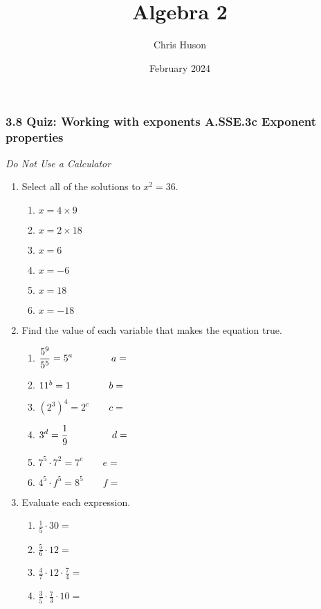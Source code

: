 \documentclass[12pt, twoside]{article}
\title{Algebra 2}
\author{Chris Huson}
\date{February 2024}
\begin{document}
\subsubsection*{3.8 Quiz: Working with exponents \hfill A.SSE.3c Exponent properties}
\emph{Do Not Use a Calculator}
\begin{enumerate}
\item Select all of the solutions to $x^2=36$.
    \begin{multicols}{2}
    \begin{enumerate}
        \item $x=4 \times 9$
        \item $x=2 \times 18$
        \item $x=6$
        \item $x=-6$
        \item $x=18$
        \item $x=-18$
    \end{enumerate}
    \end{multicols}

    \item Find the value of each variable that makes the equation true.
    \begin{multicols}{2}
    \begin{enumerate}[itemsep=0.5cm]
        \item $\displaystyle \frac{5^9}{5^5} = 5^a \hspace{1.4cm}  a=$
        \item $11^b=1 \hspace{1.4cm} b=$
        \item $(2^3)^4 = 2^c \qquad c=$
        \item $\displaystyle 3^d = \frac{1}{9} \hspace{1.6cm}  d=$
        \item $7^5 \cdot 7^2 = 7^e \qquad e=$
        \item $4^5 \cdot f^5 = 8^5 \qquad f=$
    \end{enumerate}
    \end{multicols} \vspace{0.5cm}

\item Evaluate each expression.
    \begin{multicols}{2}
    \begin{enumerate}[itemsep=0.5cm]
        \item $\displaystyle \frac{1}{5} \cdot 30=$
        \item $\displaystyle \frac{5}{6} \cdot 12=$
        \item $\displaystyle \frac{4}{7} \cdot 12 \cdot \frac{7}{4}=$
        \item $\displaystyle \frac{3}{5} \cdot \frac{7}{3} \cdot 10=$
    \end{enumerate}
    \end{multicols} \vspace{0.5cm}


\end{enumerate}
\end{document}
